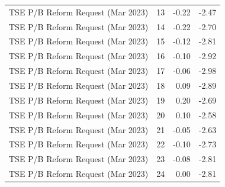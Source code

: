 \begin{table}
\begin{tabular}{lrrr}
TSE P/B Reform Request (Mar 2023) & 13 & -0.22 & -2.47 \\
TSE P/B Reform Request (Mar 2023) & 14 & -0.22 & -2.70 \\
TSE P/B Reform Request (Mar 2023) & 15 & -0.12 & -2.81 \\
TSE P/B Reform Request (Mar 2023) & 16 & -0.10 & -2.92 \\
TSE P/B Reform Request (Mar 2023) & 17 & -0.06 & -2.98 \\
TSE P/B Reform Request (Mar 2023) & 18 & 0.09 & -2.89 \\
TSE P/B Reform Request (Mar 2023) & 19 & 0.20 & -2.69 \\
TSE P/B Reform Request (Mar 2023) & 20 & 0.10 & -2.58 \\
TSE P/B Reform Request (Mar 2023) & 21 & -0.05 & -2.63 \\
TSE P/B Reform Request (Mar 2023) & 22 & -0.10 & -2.73 \\
TSE P/B Reform Request (Mar 2023) & 23 & -0.08 & -2.81 \\
TSE P/B Reform Request (Mar 2023) & 24 & 0.00 & -2.81 \\
\bottomrule
\end{tabular}
\end{table}
